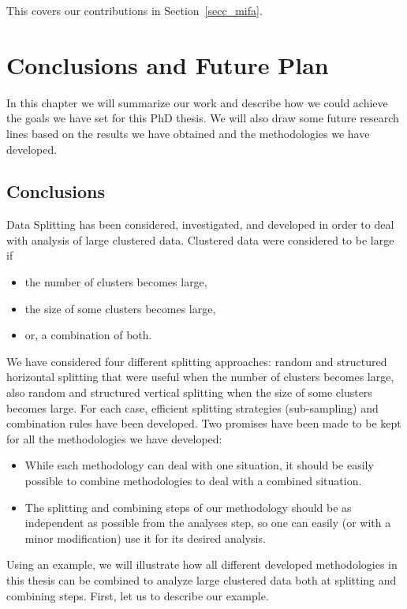 \documentclass[11pt,a5paper,twoside]{book}
\begin{document}
This covers our contributions in Section~\ref{secc_mifa}.

\chapter{Conclusions and Future Plan}
\label{chap_conclusions}

In this chapter we will summarize our work and describe how we could achieve the goals we have set for this PhD thesis. We will also draw some future research lines based on the results we have obtained and the methodologies we have developed.

\section{Conclusions}
\label{sec_conc}
Data Splitting has been considered, investigated, and developed in order to deal with analysis of large clustered data. Clustered data were considered to be large if

\begin{itemize}
\item the number of clusters becomes large,
\item the size of some clusters becomes large,
\item or, a combination of both.
\end{itemize}
We have considered four different splitting approaches: random and structured horizontal splitting that were useful when the number of clusters becomes large, also random and structured vertical splitting when the size of some clusters becomes large. For each case, efficient splitting strategies (sub-sampling) and combination rules have been developed. Two promises have been made to be kept for all the methodologies we have developed:


\begin{itemize}
\item While each methodology can deal with one situation, it should be easily possible to combine methodologies to deal with a combined situation.

\item The splitting and combining steps of our methodology should be as independent as possible from the analyses step, so one can easily (or with a minor modification) use it for its desired analysis.
 
\end{itemize}

Using an example, we will illustrate how all different developed methodologies in this thesis can be combined to analyze large clustered data both at splitting and combining steps. First, let us to describe our example.
\end{document}
